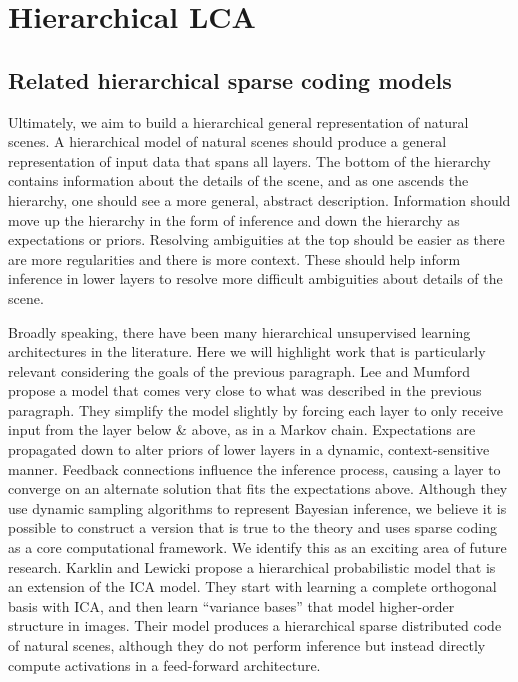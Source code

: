 \chapter{Hierarchical LCA}

\section{Related hierarchical sparse coding models}
Ultimately, we aim to build a hierarchical general representation of natural scenes. A hierarchical model of natural scenes should produce a general representation of input data that spans all layers. The bottom of the hierarchy contains information about the details of the scene, and as one ascends the hierarchy, one should see a more general, abstract description. Information should move up the hierarchy in the form of inference and down the hierarchy as expectations or priors. Resolving ambiguities at the top should be easier as there are more regularities and there is more context. These should help inform inference in lower layers to resolve more difficult ambiguities about details of the scene.

Broadly speaking, there have been many hierarchical unsupervised learning architectures in the literature. Here we will highlight work that is particularly relevant considering the goals of the previous paragraph. Lee and Mumford \citeyearpar{lee2003hierarchical} propose a model that comes very close to what was described in the previous paragraph. They simplify the model slightly by forcing each layer to only receive input from the layer below & above, as in a Markov chain. Expectations are propagated down to alter priors of lower layers in a dynamic, context-sensitive manner. Feedback connections influence the inference process, causing a layer to converge on an alternate solution that fits the expectations above. Although they use dynamic sampling algorithms to represent Bayesian inference, we believe it is possible to construct a version that is true to the theory and uses sparse coding as a core computational framework. We identify this as an exciting area of future research. Karklin and Lewicki \citeyearpar{karklin2003learning} propose a hierarchical probabilistic model that is an extension of the ICA model. They start with learning a complete orthogonal basis with ICA, and then learn ``variance bases'' that model higher-order structure in images. Their model produces a hierarchical sparse distributed code of natural scenes, although they do not perform inference but instead directly compute activations in a feed-forward architecture.

